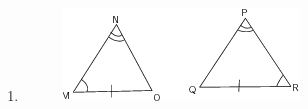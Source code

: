 \begin{enumerate}[noitemsep, label=\textbf{\arabic*}. ]
\begin{enumerate}[noitemsep, label=\textbf{\alph*}. ]
\begin{figure}[H]
\begin{center}
\vspace{2pt}
\vspace{.1in}
\end{center}
\end{figure}     
\item 
\setcounter{subfigure}{0}
\begin{figure}[H] %
\begin{center}
\label{m39368*id320548!!!underscore!!!media}\label{m39368*id320548!!!underscore!!!printimage}\includegraphics{col11306.imgs/m39368_MG10C13_062.png} %
\vspace{2pt}
\vspace{.1in}
\end{center}
\end{figure}       


\end{enumerate}
\end{enumerate}
